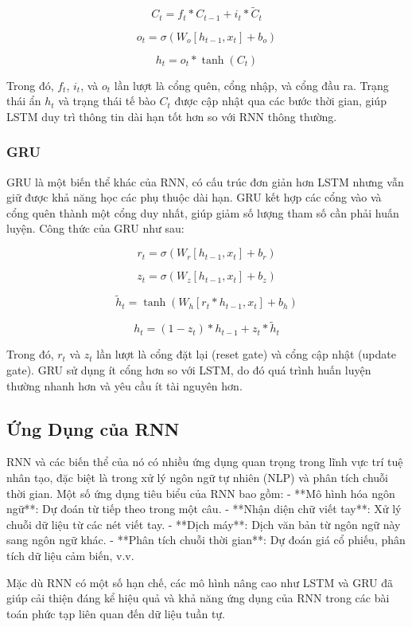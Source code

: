 \begin{equation}
    C_t = f_t * C_{t-1} + i_t * \tilde{C}_t
\end{equation}

\begin{equation}
    o_t = \sigma(W_o [h_{t-1}, x_t] + b_o)
\end{equation}

\begin{equation}
    h_t = o_t * \tanh(C_t)
\end{equation}

Trong đó, $f_t$, $i_t$, và $o_t$ lần lượt là cổng quên, cổng nhập, và cổng đầu ra. Trạng thái ẩn $h_t$ và trạng thái tế bào $C_t$ được cập nhật qua các bước thời gian, giúp LSTM duy trì thông tin dài hạn tốt hơn so với RNN thông thường.

\subsubsection{GRU}

GRU là một biến thể khác của RNN, có cấu trúc đơn giản hơn LSTM nhưng vẫn giữ được khả năng học các phụ thuộc dài hạn. GRU kết hợp các cổng vào và cổng quên thành một cổng duy nhất, giúp giảm số lượng tham số cần phải huấn luyện. Công thức của GRU như sau:

\begin{equation}
    r_t = \sigma(W_r [h_{t-1}, x_t] + b_r)
\end{equation}

\begin{equation}
    z_t = \sigma(W_z [h_{t-1}, x_t] + b_z)
\end{equation}

\begin{equation}
    \tilde{h}_t = \tanh(W_h [r_t * h_{t-1}, x_t] + b_h)
\end{equation}

\begin{equation}
    h_t = (1 - z_t) * h_{t-1} + z_t * \tilde{h}_t
\end{equation}

Trong đó, $r_t$ và $z_t$ lần lượt là cổng đặt lại (reset gate) và cổng cập nhật (update gate). GRU sử dụng ít cổng hơn so với LSTM, do đó quá trình huấn luyện thường nhanh hơn và yêu cầu ít tài nguyên hơn.

\subsection{Ứng Dụng của RNN}

RNN và các biến thể của nó có nhiều ứng dụng quan trọng trong lĩnh vực trí tuệ nhân tạo, đặc biệt là trong xử lý ngôn ngữ tự nhiên (NLP) và phân tích chuỗi thời gian. Một số ứng dụng tiêu biểu của RNN bao gồm:
- **Mô hình hóa ngôn ngữ**: Dự đoán từ tiếp theo trong một câu.
- **Nhận diện chữ viết tay**: Xử lý chuỗi dữ liệu từ các nét viết tay.
- **Dịch máy**: Dịch văn bản từ ngôn ngữ này sang ngôn ngữ khác.
- **Phân tích chuỗi thời gian**: Dự đoán giá cổ phiếu, phân tích dữ liệu cảm biến, v.v.

Mặc dù RNN có một số hạn chế, các mô hình nâng cao như LSTM và GRU đã giúp cải thiện đáng kể hiệu quả và khả năng ứng dụng của RNN trong các bài toán phức tạp liên quan đến dữ liệu tuần tự.
